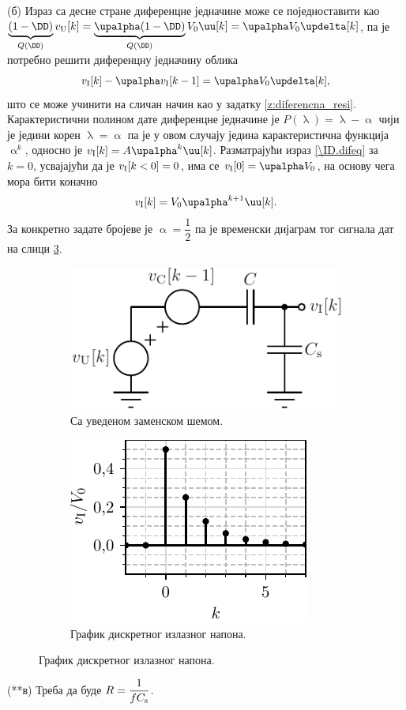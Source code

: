 (б) Израз са десне стране диференцне једначине може се поједноставити као 
$\underbrace{(1 - \DD)}_{Q(\DD)} v_{\rm U}[k] = \underbrace{\upalpha(1 - \DD)}_{Q(\DD)} V_0 \uu[k] =\upalpha V_0 \updelta[k]$, па је потребно 
решити диференцну једначину облика
\begin{equation}
    v_{\rm I}[k] - \upalpha v_{\rm I}[k-1] = \upalpha V_0 \updelta[k], \label{\ID.difeq}
\end{equation}
што се може учинити на сличан начин као у задатку \ref{z:diferencna_resi}. Карактеристични полином дате диференцне једначине је 
$P(\uplambda) = \uplambda - \upalpha$ чији је једини корен $\uplambda = \upalpha$ па је у овом случају једина карактеристична 
функција $\upalpha^k$,  односно је $v_{\rm I}[k] = A \upalpha^k \uu[k]$. Разматрајући израз \eqref{\ID.difeq} за $k=0$, усвајајући
да је $v_{\rm I}[k < 0] = 0$, има се $v_{\rm I}[0] = \upalpha V_0$, на основу чега мора бити коначно
\begin{equation}
    v_{\rm I}[k] = V_0 \upalpha^{k+1} \uu[k]. 
\end{equation}
За конкретно задате бројеве је $\upalpha = \dfrac{1}{2}$ па је временски дијаграм тог сигнала дат на слици 
\ref{\ID.fig.b}.

\begin{figure}
    \begin{subfigure}{0.49\textwidth}
        \centering
        \includegraphics[scale=1]{fig/sc-sol.pdf}
        \caption{Са уведеном заменском шемом.}
        \label{\ID.zam_sch}
    \end{subfigure}
    \begin{subfigure}{0.49\textwidth}
        \centering
        \includegraphics[scale=1]{fig/sc_plot.pdf}
        \caption{График дискретног излазног напона.}
        \label{\ID.fig.b}
    \end{subfigure}
\end{figure}

({\color{red}**}в) Треба да буде $R = \dfrac{1}{fC_{\rm s}}$.